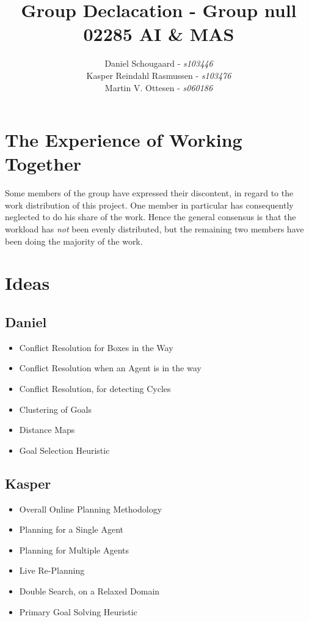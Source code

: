\documentclass[10pt,a4paper]{article}
\title{Group Declacation - Group null\\ 02285 AI \& MAS}
\author{
	Daniel Schougaard - \textit{s103446} \\
 	Kasper Reindahl Rasmussen - \textit{s103476} \\
 	Martin V. Ottesen - \textit{s060186}
 }
\begin{document}
\clearpage\maketitle
\thispagestyle{empty}

\section*{The Experience of Working Together}
	Some members of the group have expressed their discontent, in regard to the work distribution of this project. One member in particular has consequently neglected to do his share of the work. Hence the general consensus is that the workload has \emph{not} been evenly distributed, but the remaining two members have been doing the majority of the work.




\pagebreak
\pagestyle{plain}

\section{Ideas}
	\subsection{Daniel}
		\begin{itemize}	
			\item Conflict Resolution for Boxes in the Way
			\item Conflict Resolution when an Agent is in the way
			\item Conflict Resolution, for detecting Cycles
			\item Clustering of Goals
			\item Distance Maps
			\item Goal Selection Heuristic
		\end{itemize}
	\subsection{Kasper}
		\begin{itemize}	
			\item Overall Online Planning Methodology
			\item Planning for a Single Agent
			\item Planning for Multiple Agents
			\item Live Re-Planning
			\item Double Search, on a Relaxed Domain
			\item Primary Goal Solving Heuristic
		\end{itemize}
\end{document}
